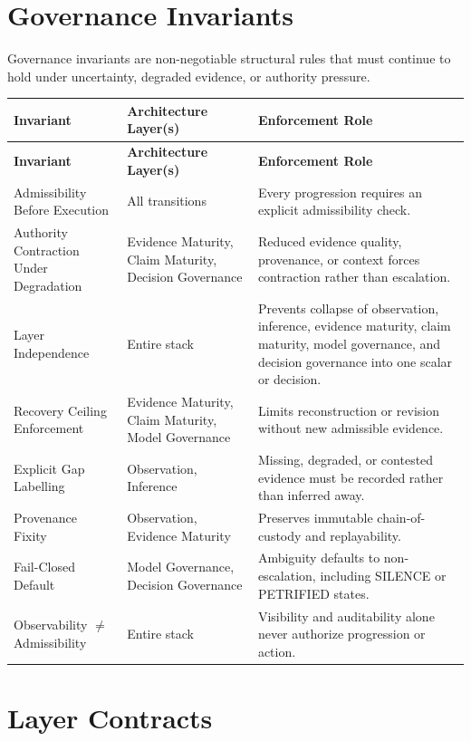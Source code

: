 \documentclass[11pt,a4paper]{article}
\begin{document}
\section{Governance Invariants}

Governance invariants are non-negotiable structural rules that must continue to hold under uncertainty, degraded evidence, or authority pressure.

\begin{longtable}{>{\raggedright\arraybackslash}p{} >{\raggedright\arraybackslash}p{} >{\raggedright\arraybackslash}p{}}
\toprule
\textbf{Invariant} & \textbf{Architecture Layer(s)} & \textbf{Enforcement Role} \\
\midrule
\endfirsthead
\toprule
\textbf{Invariant} & \textbf{Architecture Layer(s)} & \textbf{Enforcement Role} \\
\midrule
\endhead
Admissibility Before Execution & All transitions & Every progression requires an explicit admissibility check. \\
Authority Contraction Under Degradation & Evidence Maturity, Claim Maturity, Decision Governance & Reduced evidence quality, provenance, or context forces contraction rather than escalation. \\
Layer Independence & Entire stack & Prevents collapse of observation, inference, evidence maturity, claim maturity, model governance, and decision governance into one scalar or decision. \\
Recovery Ceiling Enforcement & Evidence Maturity, Claim Maturity, Model Governance & Limits reconstruction or revision without new admissible evidence. \\
Explicit Gap Labelling & Observation, Inference & Missing, degraded, or contested evidence must be recorded rather than inferred away. \\
Provenance Fixity & Observation, Evidence Maturity & Preserves immutable chain-of-custody and replayability. \\
Fail-Closed Default & Model Governance, Decision Governance & Ambiguity defaults to non-escalation, including SILENCE or PETRIFIED states. \\
Observability $\neq$ Admissibility & Entire stack & Visibility and auditability alone never authorize progression or action. \\
\bottomrule
\end{longtable}

\section{Layer Contracts}
\end{document}
